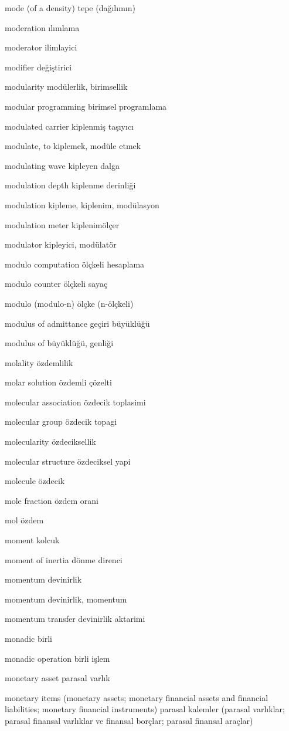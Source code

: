 \documentclass[12pt,fleqn]{article}\usepackage{../../common}
\begin{document}
mode (of a density) tepe (dağılımın)

moderation ılımlama

moderator ilimlayici

modifier değiştirici

modularity modülerlik, birimsellik

modular programming birimsel programlama

modulated carrier kiplenmiş taşıyıcı

modulate, to kiplemek, modüle etmek

modulating wave kipleyen dalga

modulation depth kiplenme derinliği

modulation kipleme, kiplenim, modülasyon

modulation meter kiplenimölçer

modulator kipleyici, modülatör

modulo computation ölçkeli hesaplama

modulo counter ölçkeli sayaç

modulo (modulo-n) ölçke (n-ölçkeli)

modulus of admittance geçiri büyüklüğü

modulus of büyüklüğü, genliği

molality özdemlilik

molar solution özdemli çözelti

molecular association özdecik toplasimi

molecular group özdecik topagi

molecularity özdeciksellik

molecular structure özdeciksel yapi

molecule özdecik

mole fraction özdem orani

mol özdem

moment kolcuk

moment of inertia dönme direnci

momentum devinirlik

momentum devinirlik, momentum

momentum transfer devinirlik aktarimi

monadic birli

monadic operation birli işlem

monetary asset parasal varlık

monetary items (monetary assets; monetary financial assets and financial liabilities; monetary financial instruments) parasal kalemler (parasal varlıklar; parasal finansal varlıklar ve finansal borçlar; parasal finansal araçlar)
\end{document}
